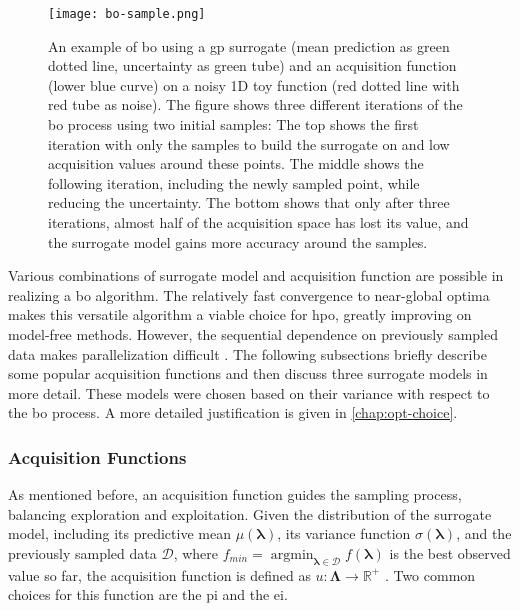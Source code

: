 \begin{figure}[h]
	\centering
	\texttt{[image: bo-sample.png]}
	\caption[An example of \gls{bo} using a \gls{gp} surrogate]{An example of \gls{bo} using a \gls{gp} surrogate (mean prediction as green dotted line, uncertainty as green tube) and an acquisition function (lower blue curve) on a noisy 1D toy function (red dotted line with red tube as noise).
		The figure shows three different iterations of the \gls{bo} process using two initial samples: The top shows the first iteration with only the samples to build the surrogate on and low acquisition values around these points. The middle shows the following iteration, including the newly sampled point, while reducing the uncertainty. The bottom shows that only after three iterations, almost half of the acquisition space has lost its value, and the surrogate model gains more accuracy around the samples.}
	\label{fig:bo-sample}
\end{figure}

Various combinations of surrogate model and acquisition function are possible in realizing a \gls{bo} algorithm. The relatively fast convergence to near-global optima makes this versatile algorithm a viable choice for \gls{hpo}, greatly improving on model-free methods. However, the sequential dependence on previously sampled data makes parallelization difficult \cite{yang2020hyperparameter}.
The following subsections briefly describe some popular acquisition functions and then discuss three surrogate models in more detail. These models were chosen based on their variance with respect to the \gls{bo} process. A more detailed justification is given in \cref{chap:opt-choice}.

\subsubsection{Acquisition Functions}
\label{chap:bo-acq}

As mentioned before, an acquisition function guides the sampling process, balancing exploration and exploitation. Given the distribution of the surrogate model, including its predictive mean $\mu(\mathbf{\lambda})$, its variance function $\sigma(\mathbf{\lambda})$, and the previously sampled data $\mathcal{D}$, where $f_{min} = \operatorname*{argmin}_{\mathbf{\lambda}\in \mathcal{D}} f(\mathbf{\lambda})$ is the best observed value so far, the acquisition function is defined as $u: \mathbf{\Lambda} \to \mathbb{R}^+$ \cite{snoek2012practical}. Two common choices for this function are the \gls{pi} and the \gls{ei}.

